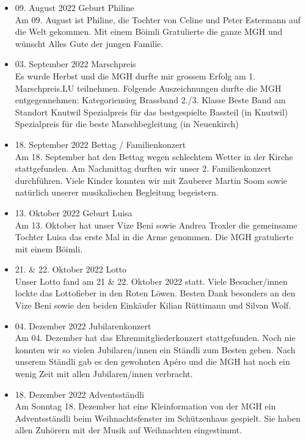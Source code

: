 \begin{history}
\begin{itemize}
        \item 09. August 2022 Geburt Philine\\
              Am 09. August ist Philine, die Tochter von Celine und Peter Estermann auf die Welt
              gekommen.
              Mit einem Böimli Gratulierte die ganze MGH und wünscht Alles Gute der jungen Familie.

        \item 03. September 2022 Marschpreis\\
              Es wurde Herbst und die MGH durfte mir grossem Erfolg am 1. Marschpreis.LU teilnehmen.
              Folgende Auszeichnungen durfte die MGH entgegennehmen:
              Kategoriensieg Brassband 2./3. Klasse
              Beste Band am Standort Knutwil
              Spezialpreis für das bestgespielte Bassteil (in Knutwil)
              Spezialpreis für die beste Marschbegleitung (in Neuenkirch)

        \item 18. September 2022 Bettag / Familienkonzert\\
              Am 18. September hat den Bettag wegen schlechtem Wetter in der Kirche stattgefunden.
              Am Nachmittag durften wir unser 2. Familienkonzert durchführen. Viele Kinder konnten wir
              mit Zauberer Martin Soom sowie natürlich unserer musikalischen Begleitung begeistern.

        \item 13. Oktober 2022 Geburt Luisa\\
              Am 13. Oktober hat unser Vize Beni sowie Andrea Troxler die gemeinsame Tochter Luisa
              das erste Mal in die Arme genommen.
              Die MGH gratulierte mit einem Böimli.

        \item 21. \& 22. Oktober 2022 Lotto\\
              Unser Lotto fand am 21 \& 22. Oktober 2022 statt. Viele Besucher/innen lockte das
              Lottofieber in den Roten Löwen.
              Besten Dank besonders an den Vize Beni sowie den beiden Einkäufer Kilian Rüttimann und
              Silvan Wolf.

        \item 04. Dezember 2022 Jubilarenkonzert\\
              Am 04. Dezember hat das Ehrenmitgliederkonzert stattgefunden. Noch nie konnten wir so
              vielen Jubilaren/innen ein Ständli zum Besten geben.
              Nach unserem Ständli gab es den gewohnten Apéro und die MGH hat noch ein wenig Zeit
              mit allen Jubilaren/innen verbracht.

        \item 18. Dezember 2022 Adventsständli\\
              Am Sonntag 18. Dezember hat eine Kleinformation von der MGH ein Adventsständli beim
              Weihnachtsfenster im Schützenhaus gespielt. Sie haben allen Zuhörern mit der Musik auf
              Weihnachten eingestimmt.


    \end{itemize}

\end{history}
